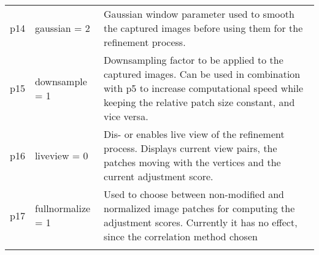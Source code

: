 \documentclass[10pt,a4paper]{article}
\begin{document}
\begin{longtable}{p{0.5cm}p{4.5cm}p{8.5cm}}
p14 & gaussian = 2 & Gaussian window parameter used to smooth the captured images before using them for the refinement process.\\ \noalign{\smallskip} \hline \noalign{\smallskip}

p15 & downsample = 1 & Downsampling factor to be applied to the captured images. Can be used in combination with p5 to increase computational speed while keeping the relative patch size constant, and vice versa.\\ \noalign{\smallskip} \hline \noalign{\smallskip}

p16 & liveview = 0 & Dis- or enables live view of the refinement process. Displays current view pairs, the patches moving with the vertices and the current adjustment score.\\ \noalign{\smallskip} \hline \noalign{\smallskip}

p17 & fullnormalize = 1 & Used to choose between non-modified and normalized image patches for computing the adjustment scores. Currently it has no effect, since the correlation method chosen \\ \noalign{\smallskip} 
\end{longtable}
\end{document}
